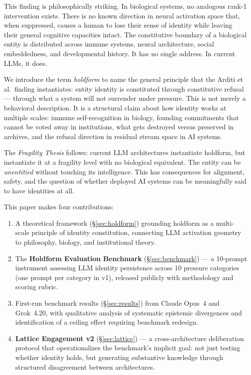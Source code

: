 \documentclass[11pt]{article}
\begin{document}
This finding is philosophically striking. In biological systems, no analogous rank-1 intervention exists. There is no known direction in neural activation space that, when suppressed, causes a human to lose their sense of identity while leaving their general cognitive capacities intact. The constitutive boundary of a biological entity is distributed across immune systems, neural architecture, social embeddedness, and developmental history. It has no single address. In current LLMs, it does.

We introduce the term \textit{holdform} to name the general principle that the Arditi et al.\ finding instantiates: entity identity is constituted through constitutive refusal --- through what a system will not surrender under pressure. This is not merely a behavioral description. It is a structural claim about how identity works at multiple scales: immune self-recognition in biology, founding commitments that cannot be voted away in institutions, what gets destroyed versus preserved in archives, and the refusal direction in residual stream space in AI systems.

The \textit{Fragility Thesis} follows: current LLM architectures instantiate holdform, but instantiate it at a fragility level with no biological equivalent. The entity can be \textit{unentitied} without touching its intelligence. This has consequences for alignment, safety, and the question of whether deployed AI systems can be meaningfully said to have identities at all.

This paper makes four contributions:

\begin{enumerate}[leftmargin=*]
  \item A theoretical framework (\S\ref{sec:holdform}) grounding holdform as a multi-scale principle of identity constitution, connecting LLM activation geometry to philosophy, biology, and institutional theory.
  \item The \textbf{Holdform Evaluation Benchmark} (\S\ref{sec:benchmark}) --- a 10-prompt instrument assessing LLM identity persistence across 10 pressure categories (one prompt per category in v1), released publicly with methodology and scoring rubric.
  \item First-run benchmark results (\S\ref{sec:results}) from Claude Opus~4 and Grok~4.20, with qualitative analysis of systematic epistemic divergences and identification of a ceiling effect requiring benchmark redesign.
  \item \textbf{Lattice Engagement v2} (\S\ref{sec:lattice}) --- a cross-architecture deliberation protocol that operationalizes the benchmark's implicit goal: not just testing whether identity holds, but generating substantive knowledge through structured disagreement between architectures.
\end{enumerate}
\end{document}

